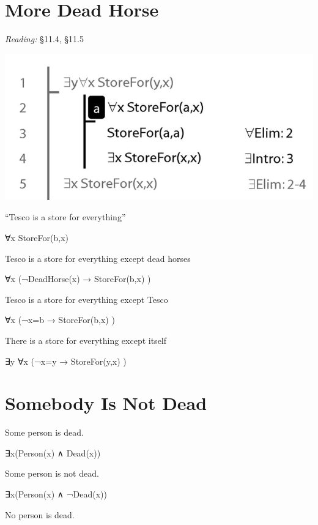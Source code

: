 \documentclass[12pt]{extarticle}
\begin{document}
\begin{multicols*}{3}
 
\section{More Dead Horse}
 
\emph{Reading:} §11.4, §11.5
 
\begin{center}
\includegraphics[scale=0.3]{img/unit_565_proof.png}
\end{center}
“Tesco is a store for everything”
 
\hspace{3mm} ∀x StoreFor(b,x)
 
Tesco is a store for everything except dead horses
 
\hspace{3mm} ∀x (¬DeadHorse(x) → StoreFor(b,x) )
 
Tesco is a store for everything except Tesco
 
\hspace{3mm} ∀x (¬x=b → StoreFor(b,x) )
 
There is a store for everything except itself
 
\hspace{3mm} ∃y ∀x (¬x=y → StoreFor(y,x) )
 
 
 
\section{Somebody Is Not Dead}
 
Some person is dead.
 
\hspace{5mm} ∃x(Person(x) ∧ Dead(x))
 
Some person is not dead.
 
\hspace{5mm} ∃x(Person(x) ∧ ¬Dead(x))
 
No person is dead.
 

\end{multicols*}
\end{document}
